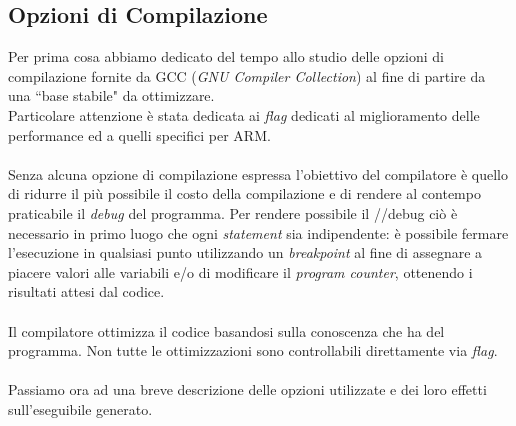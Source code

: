 
\subsection{Opzioni di Compilazione}
Per prima cosa abbiamo dedicato del tempo allo studio delle opzioni di 
compilazione fornite da GCC (\emph{GNU Compiler Collection}) al fine di partire 
da una ``base stabile" da ottimizzare.\\
Particolare attenzione è stata dedicata ai \emph{flag} dedicati al 
miglioramento delle performance ed a quelli specifici per ARM.\\
\\
Senza alcuna opzione di compilazione espressa l'obiettivo del compilatore è 
quello di ridurre il più possibile il costo della compilazione e di rendere al 
contempo praticabile il \emph{debug} del programma. Per rendere possibile il 
//debug ciò è necessario in primo luogo che ogni \emph{statement} sia 
indipendente: è possibile fermare l'esecuzione in qualsiasi punto utilizzando 
un \emph{breakpoint} al fine di assegnare a piacere valori alle variabili e/o 
di modificare il \emph{program counter}, ottenendo i risultati attesi dal 
codice.\\
\\
Il compilatore ottimizza il codice basandosi sulla conoscenza che ha del 
programma. Non tutte le ottimizzazioni sono controllabili direttamente via 
\emph{flag}.\\
\\
Passiamo ora ad una breve descrizione delle opzioni utilizzate e dei loro 
effetti sull'eseguibile generato.

